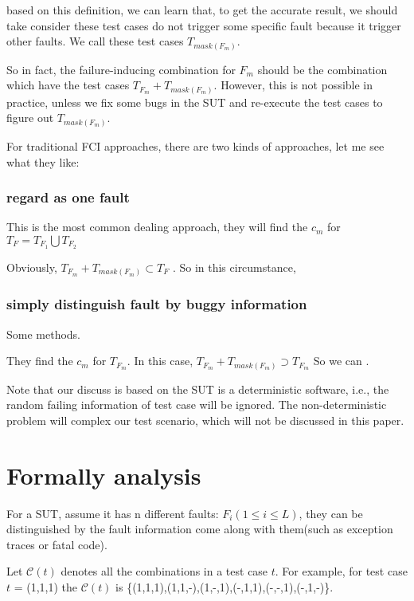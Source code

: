 \documentclass{sig-alternate}
\begin{document}
based on this definition, we can learn that, to get the accurate result, we should take consider these test cases do not trigger some specific fault because it trigger other faults. We call these test cases $T_{mask(F_{m})}$. 

So in fact, the failure-inducing combination for $F_{m}$ should be the combination which have the test cases $T_{F_{m}} + T_{mask(F_{m})}$. However, this is not possible in practice, unless we fix some bugs in the SUT and re-execute the test cases to figure out $T_{mask(F_{m})}$.

For traditional FCI approaches, there are two kinds of approaches, let me see what they like:

\subsubsection{regard as one fault}
This is the most common dealing approach, 
they will find the $c_{m}$ for $T_{F} = T_{F_{1}} \bigcup T_{F_{2}}$

Obviously, $T_{F_{m}} + T_{mask(F_{m})} \subset T_{F}$ . So in this circumstance, 


\subsubsection{simply distinguish fault by buggy information}
Some methods. 

They find the $c_{m}$ for $T_{F_{m}}$. In this case, $T_{F_{m}} + T_{mask(F_{m})} \supset T_{F_{m}} $ 
So we can .



Note that our discuss is based on the SUT is a deterministic software, i.e., the random failing information of test case will be ignored. The non-deterministic problem will complex our test scenario, which will not be discussed in this paper.

\section{Formally analysis}
For a SUT, assume it has n different faults: $F_{i} ( 1 \leq i \leq L)$, they can be distinguished by the fault information come along with them(such as exception traces or fatal code).

Let $\mathcal{C}(t)$ denotes all the combinations in a test case $t$. For example, for test case $t$ = (1,1,1) the  $\mathcal{C}(t)$ is \{(1,1,1),(1,1,-),(1,-,1),(-,1,1),(-,-,1),(-,1,-)\}.
\end{document}
